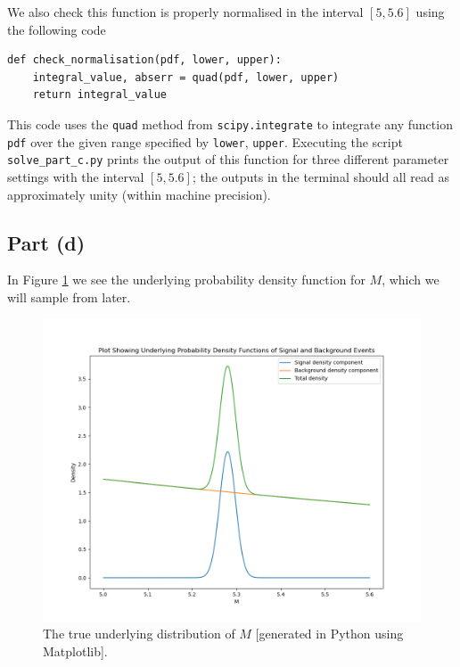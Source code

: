 \documentclass[12pt]{article}
\begin{document}
We also check this function is properly normalised in the interval $[5, 5.6]$ using the following code

\begin{lstlisting}[caption=Function checking the normalisation of the pdf for part (c).]
def check_normalisation(pdf, lower, upper):
    integral_value, abserr = quad(pdf, lower, upper)
    return integral_value
\end{lstlisting}

This code uses the \texttt{quad} method from \texttt{scipy.integrate} to integrate any function \texttt{pdf} over the given range specified by \texttt{lower}, \texttt{upper}.
Executing the script \texttt{solve\_part\_c.py} prints the output of this function for three different parameter settings with the interval $[5, 5.6]$; the outputs in the terminal should all read as approximately unity (within machine precision).

\subsection*{Part (d)}

In Figure \ref{partd} we see the underlying probability density function for $M$, which we will sample from later.

\begin{figure}[hbt]
    \includegraphics[scale=0.5]{part_d_plot.png}
    \caption{The true underlying distribution of $M$ [generated in Python using Matplotlib].}
    \label{partd}
\end{figure}
\end{document}
